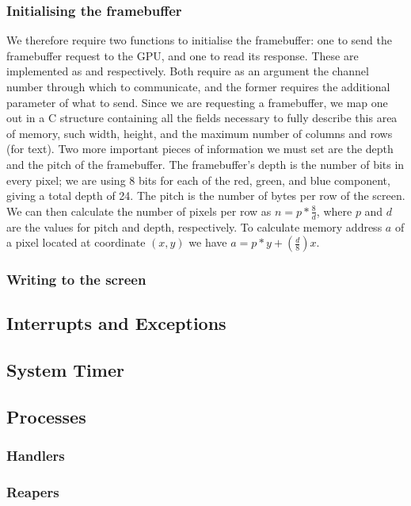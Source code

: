     \subsubsection{Initialising the framebuffer}
        We therefore require two functions to initialise the framebuffer: one to
        send the framebuffer request to the GPU, and one to read its response.
        These are implemented as  and
         respectively. Both require as an argument the
        channel number through which to communicate, and the former requires the
        additional parameter of what to send. Since we are requesting a
        framebuffer, we map one out in a C structure containing all the fields
        necessary to fully describe this area of memory, such width, height, and
        the maximum number of columns and rows (for text). Two more important
        pieces of information we must set are the depth and the pitch of the
        framebuffer. The framebuffer's depth is the number of bits in every
        pixel; we are using 8 bits for each of the red, green, and blue
        component, giving a total depth of 24. The pitch is the number of bytes
        per row of the screen. We can then calculate the number of pixels per
        row as $n = p * \frac{8}{d}$, where $p$ and $d$ are the values for pitch
        and depth, respectively. To calculate memory address $a$ of a pixel located
        at coordinate $(x,y)$ we have $a = p * y + (\frac{d}{8}) x$.

    \subsubsection{Writing to the screen}

\subsection{Interrupts and Exceptions}
\subsection{System Timer}
\subsection{Processes}
    \subsubsection{Handlers}
    \subsubsection{Reapers}
        \label{sec:cleanup}
